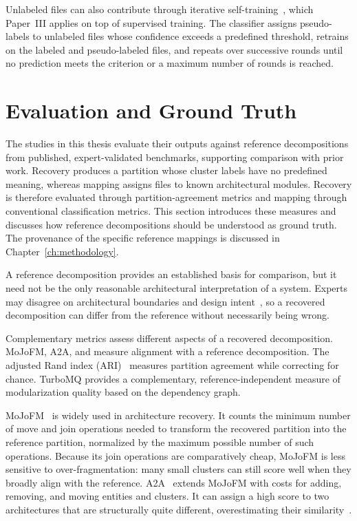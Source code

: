 Unlabeled files can also contribute through iterative self-training~\cite{lee2013pseudo}, which Paper~III applies on top of supervised training. The classifier assigns pseudo-labels to unlabeled files whose confidence exceeds a predefined threshold, retrains on the labeled and pseudo-labeled files, and repeats over successive rounds until no prediction meets the criterion or a maximum number of rounds is reached.

\section[Evaluation and Ground Truth]{Evaluation and Ground Truth}
\label{sec:bg-eval}

The studies in this thesis evaluate their outputs against reference decompositions from published, expert-validated benchmarks, supporting comparison with prior work. Recovery produces a partition whose cluster labels have no predefined meaning, whereas mapping assigns files to known architectural modules. Recovery is therefore evaluated through partition-agreement metrics and mapping through conventional classification metrics. This section introduces these measures and discusses how reference decompositions should be understood as ground truth. The provenance of the specific reference mappings is discussed in Chapter~\ref{ch:methodology}.

A reference decomposition provides an established basis for comparison, but it need not be the only reasonable architectural interpretation of a system. Experts may disagree on architectural boundaries and design intent~\cite{garcia2013}, so a recovered decomposition can differ from the reference without necessarily being wrong.

Complementary metrics assess different aspects of a recovered decomposition. MoJoFM, A2A, and \cc{} measure alignment with a reference decomposition. The adjusted Rand index (ARI)~\cite{ari} measures partition agreement while correcting for chance. TurboMQ provides a complementary, reference-independent measure of modularization quality based on the dependency graph.

MoJoFM~\cite{mojofm} is widely used in architecture recovery. It counts the minimum number of move and join operations needed to transform the recovered partition into the reference partition, normalized by the maximum possible number of such operations. Because its join operations are comparatively cheap, MoJoFM is less sensitive to over-fragmentation: many small clusters can still score well when they broadly align with the reference. A2A~\cite{a2a} extends MoJoFM with costs for adding, removing, and moving entities and clusters. It can assign a high score to two architectures that are structurally quite different, overestimating their similarity~\cite{turbomq}.

